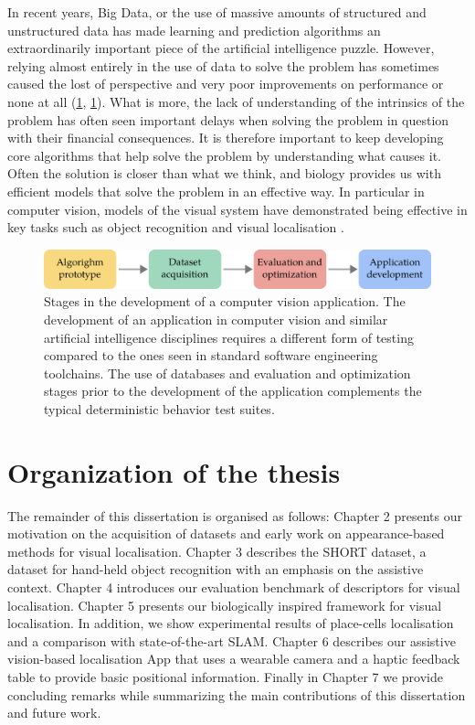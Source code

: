 In recent years, Big Data, or the use of massive amounts of structured and unstructured data has made learning and prediction algorithms an extraordinarily important piece of the artificial intelligence puzzle. However, relying almost entirely in the use of data to solve the problem has sometimes caused the lost of perspective and very poor improvements on performance or none at all (\ref{}, \ref{}). What is more, the lack of understanding of the intrinsics of the problem has often seen important delays when solving the problem in question with their financial consequences. It is therefore important to keep developing core algorithms that help solve the problem by understanding what causes it. Often the solution is closer than what we think, and biology provides us with efficient models that solve the problem in an effective way. In particular in computer vision, models of the visual system have demonstrated being effective in key tasks such as object recognition and visual localisation \cite{lowe2004distinctive,milford2004ratslam}. 


\begin{figure}
\centering
\includegraphics[width=\linewidth]{gfx/Chapter01/cv_dev_pipeline.pdf}
\caption{Stages in the development of a computer vision application. The development of an application in computer vision and similar artificial intelligence disciplines requires a different form of testing compared to the ones seen in standard software engineering toolchains. The use of databases and evaluation and optimization stages prior to the development of the application complements the typical deterministic behavior test suites.}
\label{fig:cv_dev_pipeline}
\end{figure}


\section{Organization of the thesis}

The remainder of this dissertation is organised as follows: Chapter 2 presents our motivation on the acquisition of datasets and early work on appearance-based methods for visual localisation. Chapter 3 describes the SHORT dataset, a dataset for hand-held object recognition with an emphasis on the assistive context. Chapter 4 introduces our evaluation benchmark of descriptors for visual localisation. Chapter 5 presents our biologically inspired framework for visual localisation. In addition, we show experimental results of place-cells localisation  and a comparison with state-of-the-art SLAM. Chapter 6 describes our assistive vision-based localisation App that uses a wearable camera and a haptic feedback table to provide basic positional information. Finally in Chapter 7 we provide concluding remarks while summarizing the main contributions of this dissertation and future work.


